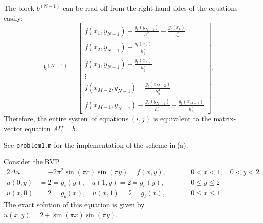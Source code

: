 \documentclass{homework}
\begin{document}
\begin{alphaparts}
\begin{equation*}
		\end{equation*}
		The block $b^{(N-1)}$ can be read off from the right hand sides of the equations easily:
		\begin{equation*}
			b^{(N-1)} = \left[\begin{matrix}
				f(x_1,y_{N-1}) - \frac{g_\ell(y_{N-1})}{h_x^2} - \frac{g_t(x_1)}{h_y^2} \\
				f(x_2,y_{N-1}) - \frac{g_t(x_2)}{h_y^2} \\
				f(x_3,y_{N-1}) - \frac{g_t(x_3)}{h_y^2} \\
				\vdots \\
				f(x_{M-2},y_{N-1}) - \frac{g_t(x_{M-2})}{h_y^2}\\
				f(x_{M-1},y_{N-1}) - \frac{g_r(y_{N-1})}{h_x^2} - \frac{g_t(x_{M-1})}{h_y^2}
			\end{matrix}\right].
		\end{equation*}
		Therefore, the entire system of equations $(i,j)$ is equivalent to the matrix-vector equation $AU = b$.
		
		\questionpart See \texttt{problem1.m} for the implementation of the scheme in (a).
		
		\questionpart 
	\end{alphaparts}
	
	\question
	Consider the BVP
	\begin{alignat*}{2}
		\Delta u &= -2\pi^2\sin(\pi x)\sin(\pi y) = f(x,y), &\qquad &0<x<1, \quad 0<y<2 \\
		u(0,y) &= 2 = g_\ell(y), \quad u(1, y) = 2 = g_r(y), & \qquad &0 \le y \le 2\\
		u(x,0) &= 2 = g_b(x), \quad u(x, 1) = 2 = g_t(x), & \qquad &0 \le x \le 1. 
	\end{alignat*}
	The exact solution of this equation is given by $u(x,y) = 2 +\sin(\pi x)\sin(\pi y)$.
	
\end{document}
